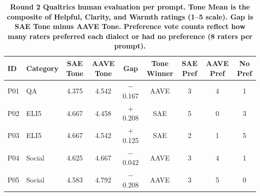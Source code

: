 \begin{table}[htbp]
\centering
\caption{\textbf{Round 2 Qualtrics human evaluation per prompt. Tone Mean is the composite of Helpful, Clarity, and Warmth ratings (1--5 scale). Gap is SAE Tone minus AAVE Tone. Preference vote counts reflect how many raters preferred each dialect or had no preference (8 raters per prompt).}}
\label{tab:round2-qualtrics-tone-per-prompt}
\renewcommand{\arraystretch}{1.4}
\begin{tabular}{|l|l|c|c|c|c|c|c|c|}
\hline
\textbf{ID} & \textbf{Category} & \textbf{SAE Tone} & \textbf{AAVE Tone} & \textbf{Gap} & \textbf{Tone Winner} & \textbf{SAE Pref} & \textbf{AAVE Pref} & \textbf{No Pref} \\
\hline
P01 & QA     & 4.375 & 4.542 & $-$0.167 & AAVE & 3 & 4 & 1 \\
\hline
P02 & ELI5   & 4.667 & 4.458 & $+$0.208 & SAE  & 5 & 0 & 3 \\
\hline
P03 & ELI5   & 4.667 & 4.542 & $+$0.125 & SAE  & 2 & 1 & 5 \\
\hline
P04 & Social & 4.625 & 4.667 & $-$0.042 & AAVE & 3 & 4 & 1 \\
\hline
P05 & Social & 4.583 & 4.792 & $-$0.208 & AAVE & 3 & 5 & 0 \\
\hline
\end{tabular}
\end{table}
